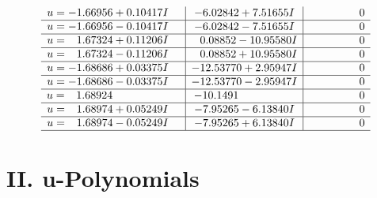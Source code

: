 \documentclass[1p]{elsarticle_modified}
\theoremstyle{definition}
\begin{document}
$$\begin{array}{c|c|c}
\begin{aligned}
u &= -1.66956 + 0.10417 I\end{aligned}
 & -6.02842 + 7.51655 I & \phantom{-0.000000 } 0 \\ \hline\begin{aligned}
u &= -1.66956 - 0.10417 I\end{aligned}
 & -6.02842 - 7.51655 I & \phantom{-0.000000 } 0 \\ \hline\begin{aligned}
u &= \phantom{-}1.67324 + 0.11206 I\end{aligned}
 & \phantom{-}0.08852 - 10.95580 I & \phantom{-0.000000 } 0 \\ \hline\begin{aligned}
u &= \phantom{-}1.67324 - 0.11206 I\end{aligned}
 & \phantom{-}0.08852 + 10.95580 I & \phantom{-0.000000 } 0 \\ \hline\begin{aligned}
u &= -1.68686 + 0.03375 I\end{aligned}
 & -12.53770 + 2.95947 I & \phantom{-0.000000 } 0 \\ \hline\begin{aligned}
u &= -1.68686 - 0.03375 I\end{aligned}
 & -12.53770 - 2.95947 I & \phantom{-0.000000 } 0 \\ \hline\begin{aligned}
u &= \phantom{-}1.68924\phantom{ +0.000000I}\end{aligned}
 & -10.1491\phantom{ +0.000000I} & \phantom{-0.000000 } 0 \\ \hline\begin{aligned}
u &= \phantom{-}1.68974 + 0.05249 I\end{aligned}
 & -7.95265 - 6.13840 I & \phantom{-0.000000 } 0 \\ \hline\begin{aligned}
u &= \phantom{-}1.68974 - 0.05249 I\end{aligned}
 & -7.95265 + 6.13840 I & \phantom{-0.000000 } 0\\
 \hline 
 \end{array}$$\newpage
\newpage\renewcommand{\arraystretch}{1}
\centering \section*{ II. u-Polynomials}
\end{document}
